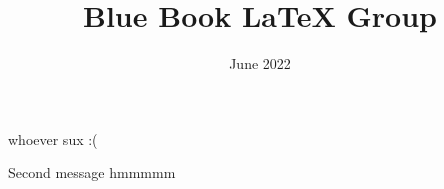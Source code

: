 \documentclass[oneside]{amsbook}
\title{Blue Book LaTeX Group}
\author{}
\date{June 2022}
\begin{document}
\maketitle
\tableofcontents

whoever sux :(

Second message hmmmmm






\printindex
\end{document}
